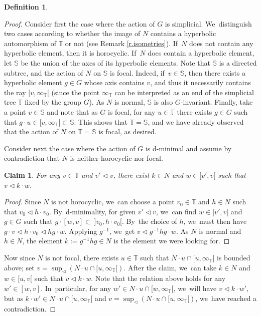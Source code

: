 \documentclass[JEP,XML,SOM,Unicode,NoFloatCountersInSection,published]{cedram}
\newtheorem*{claim}{Claim}
\theoremstyle{definition}
\newtheorem{dfn}[thm]{Definition}
\newcommand{\Tbb}{\mathbb T}
\newcommand{\treeorder}{\mathrel{\triangleleft}}
\begin{document}
\begin{dfn}
\begin{proof}
Consider first the case where the action of $G$ is simplicial. We~distinguish two cases according to whether the image of $N$ contains a hyperbolic automorphism of $\Tbb$ or not (see Remark \ref{r.isometries}). If~$N$ does not contain any hyperbolic element, then it is horocyclic. If~$N$ does contain a hyperbolic element, let $\mathbb S$ be the union of the axes of its hyperbolic elements. Note that $\mathbb S$ is a directed subtree, and the action of $N$ on $\mathbb S$ is focal. Indeed, if~$v\in \mathbb{S}$, then there exists a hyperbolic element $g\in G$ whose axis contains $v$, and thus it necessarily contains the ray $[v,\infty_\Tbb[$ (since the point $\infty_\Tbb$ can be interpreted as an end of the simplicial tree $\Tbb$ fixed by the group $G$). As $N$ is normal, $\mathbb S$ is also $G$-invariant. Finally, take a point $v\in \mathbb S$ and note that as $G$ is focal, for any $u\in \Tbb$ there exists $g\in G$ such that $g\cdot u\in [v,\infty_\Tbb[{}\subset \mathbb S$. This shows that $\Tbb=\mathbb S$, and we have already observed that the action of $N$ on $\Tbb=\mathbb S$ is focal, as desired.

Consider next the case where the action of $G$ is d-minimal and assume by contradiction that $N$ is neither horocyclic nor focal.

\begin{claim}
For any $v\in \Tbb$ and $v'\treeorder v$, there exist $k\in N$ and $w\in [v', v[$ such that $v\treeorder k\cdot w$.
\end{claim}

\begin{proof}
Since $N$ is not horocyclic, we~can choose a point $v_0\in \Tbb$ and $h\in N$ such that $v_0\treeorder h\cdot v_0$. By~d-minimality, for given $v'\treeorder v$, we~can find $w\in [v', v[$ and $g\in G$ such that $g\cdot [w,v]\subset\, ]v_0,h\cdot v_0[$. By~the choice of $h$, we~must then have $g\cdot v\treeorder h\cdot v_0\treeorder hg\cdot w$. Applying $g^{-1}$, we~get $v\treeorder g^{-1}hg\cdot w$. As $N$ is normal and $h\in N$, the element $k:=g^{-1}hg\in N$ is the element we were looking for.
\end{proof}

Now since $N$ is not focal, there exists $u\in \Tbb$ such that $N\cdot u\cap [u, \infty_\Tbb[$ is bounded above; set $v=\sup_{\treeorder} (N\cdot u\cap [u, \infty_\Tbb[)$. After the claim, we~can take $k\in N$ and $w\in [u, v[$ such that $v\treeorder k\cdot w$. Note that the relation above holds for any $w'\in [w,v]$. In~particular, for any $w'\in N\cdot u\cap [w,\infty_\Tbb[$, we~will have $v\treeorder k\cdot w'$, but as $k\cdot w'\in N\cdot u\cap [u,\infty_\Tbb[$ and $v=\sup_{\treeorder} (N\cdot u\cap [u, \infty_\Tbb[)$, we~have reached a contradiction.
\end{proof}


\end{dfn}
\end{document}
